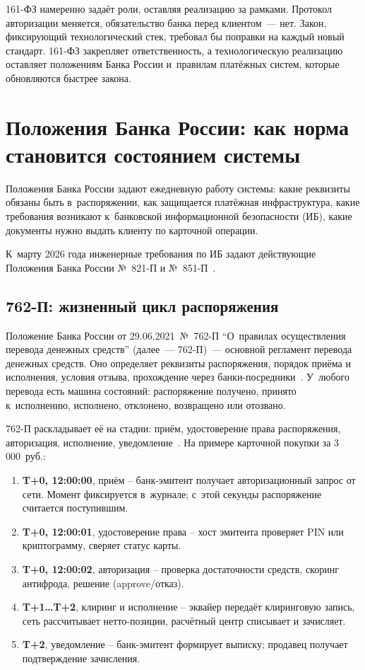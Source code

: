 161-ФЗ намеренно задаёт роли, оставляя реализацию за рамками. Протокол авторизации меняется, обязательство банка перед клиентом~--- нет.
Закон, фиксирующий технологический стек, требовал бы поправки на каждый новый стандарт. 161-ФЗ закрепляет ответственность, а технологическую реализацию оставляет положениям Банка России и~правилам платёжных систем, которые обновляются быстрее закона.

\section{Положения Банка России: как норма становится состоянием системы}\label{sec:regulation-cbr-provisions}

Положения Банка России задают ежедневную работу системы: какие реквизиты обязаны быть в~распоряжении, как защищается платёжная инфраструктура, какие требования возникают к~банковской информационной безопасности (ИБ), какие документы нужно выдать клиенту по карточной операции.

К~марту 2026 года инженерные требования по ИБ задают действующие Положения Банка России №~821-П и №~851-П~\cite{cbr-821p,cbr-851p}.

\subsection*{762-П: жизненный цикл распоряжения}

Положение Банка России от 29.06.2021~№~762-П \enquote{О~правилах осуществления перевода денежных средств} (далее~--- 762-П)~--- основной регламент перевода денежных средств. Оно определяет реквизиты распоряжения, порядок приёма и исполнения, условия отзыва, прохождение через банки-посредники~\cite{cbr-762p}.
У~любого перевода есть машина состояний: распоряжение получено, принято к~исполнению, исполнено, отклонено, возвращено или отозвано.

762-П раскладывает её на стадии: приём, удостоверение права распоряжения, авторизация, исполнение, уведомление~\cite{cbr-762p}. На примере карточной покупки за 3\,000~руб.:

\begin{enumerate}
  \item \textbf{T+0, 12:00:00}, приём -- банк-эмитент получает
    авторизационный запрос от сети. Момент фиксируется
    в~журнале; с~этой секунды распоряжение считается поступившим.
  \item \textbf{T+0, 12:00:01}, удостоверение права -- хост
    эмитента проверяет PIN или криптограмму, сверяет статус карты.
  \item \textbf{T+0, 12:00:02}, авторизация -- проверка
    достаточности средств, скоринг антифрода, решение
    (approve/отказ).
  \item \textbf{T+1\ldots T+2}, клиринг и исполнение -- эквайер
    передаёт клиринговую запись, сеть рассчитывает нетто-позиции,
    расчётный центр списывает и зачисляет.
  \item \textbf{T+2}, уведомление -- банк-эмитент формирует
    выписку; продавец получает подтверждение зачисления.
\end{enumerate}


